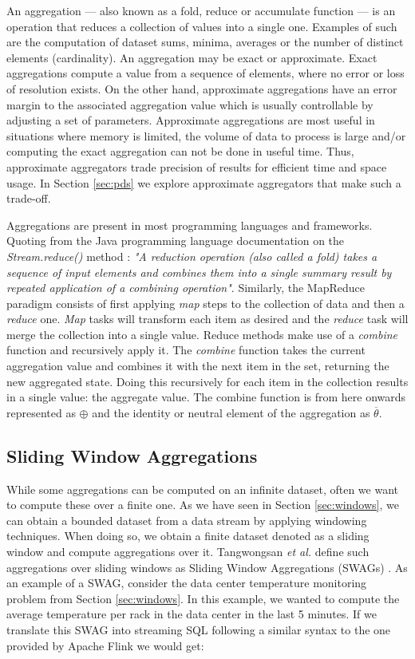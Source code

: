 An aggregation --- also known as a fold, reduce or accumulate function --- is an operation that reduces a collection of values into a single one. Examples of such are the computation of dataset sums, minima, averages or the number of distinct elements (cardinality). An aggregation may be exact or approximate. Exact aggregations compute a value from a sequence of elements, where no error or loss of resolution exists. On the other hand, approximate aggregations have an error margin to the associated aggregation value which is usually controllable by adjusting a set of parameters. 
Approximate aggregations are most useful in situations where memory is limited, the volume of data to process is large and/or computing the exact aggregation can not be done in useful time. Thus, approximate aggregators trade precision of results for efficient time and space usage. In Section \ref{sec:pds} we explore approximate aggregators that make such a trade-off.

Aggregations are present in most programming languages and frameworks. Quoting from the Java programming language documentation on the \textit{Stream.reduce()} method \cite{Java13StreamReduce}: 
\textit{"A reduction operation (also called a fold) takes a sequence of input elements and combines them into a single summary result by repeated application of a combining operation"}. Similarly, the MapReduce \cite{MapReduce} paradigm consists of first applying \textit{map} steps to the collection of data and then a \textit{reduce} one. \textit{Map} tasks will transform each item as desired and the \textit{reduce} task will merge the collection into a single value. Reduce methods make use of a \textit{combine} function and recursively apply it. The \textit{combine} function takes the current aggregation value and combines it with the next item in the set, returning the new aggregated state. Doing this recursively for each item in the collection results in a single value: the aggregate value. The combine function is from here onwards represented as $\oplus$ and the identity or neutral element of the aggregation as $\overline{\theta}$.

\subsection{Sliding Window Aggregations}

While some aggregations can be computed on an infinite dataset, often we want to compute these over a finite one. As we have seen in Section \ref{sec:windows}, we can obtain a bounded dataset from a data stream by applying windowing techniques. When doing so, we obtain a finite dataset denoted as a sliding window and compute aggregations over it. Tangwongsan \emph{et al.} define such aggregations over sliding windows as Sliding Window Aggregations (SWAGs) \cite{Tangwongsan-Sliding-Window-Aggregation-Algorithms}. As an example of a SWAG, consider the data center temperature monitoring problem from Section \ref{sec:windows}. In this example, we wanted to compute the average temperature per rack in the data center in the last 5 minutes. If we translate this SWAG into streaming SQL following a similar syntax to the one provided by Apache Flink \cite{ApacheFlink} we would get:

